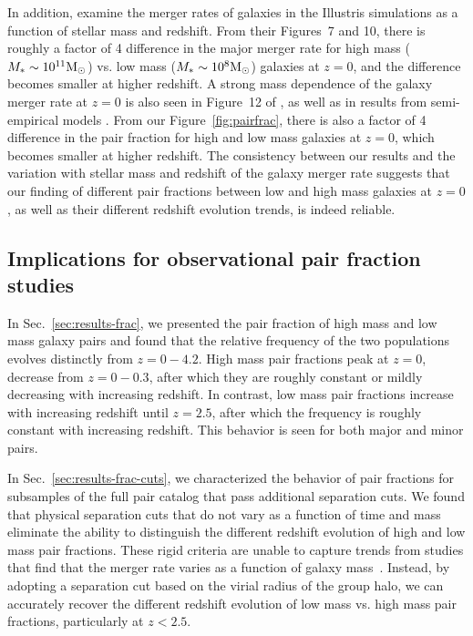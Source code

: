 \documentclass[twocolumn]{aastex631}
\begin{document}
        In addition, \cite{RG2015} examine the merger rates of galaxies in the Illustris simulations as a function of stellar mass and redshift.
        From their Figures~7 and 10, there is roughly a factor of 4 difference in the major merger rate for high mass ($M_* \sim 10^{11} \mathrm{M}_\odot$) vs. low mass ($M_* \sim 10^8 \mathrm{M}_\odot$) galaxies at $z=0$, and the difference becomes smaller at higher redshift. 
        A strong mass dependence of the galaxy merger rate at $z=0$ is also seen in Figure~12 of \cite{Guzman-Ortega2023}, as well as in results from semi-empirical models \citep{Stewart2009, Hopkins2010}.
        From our Figure~\ref{fig:pairfrac}, there is also a factor of 4 difference in the pair fraction for high and low mass galaxies at $z=0$, which becomes smaller at higher redshift.
        The consistency between our results and the variation with stellar mass and redshift of the galaxy merger rate suggests that our finding of different pair fractions between low and high mass galaxies at $z=0$, as well as their different redshift evolution trends, is indeed reliable.  

\subsection{Implications for observational pair fraction studies}\label{sec:disc-obs}

    In Sec.~\ref{sec:results-frac}, we presented the pair fraction of high mass and low mass galaxy pairs and found that the relative frequency of the two populations evolves distinctly from $z=0-4.2$. 
    High mass pair fractions peak at $z=0$, decrease from $z=0-0.3$, after which they are roughly constant or mildly decreasing with increasing redshift. 
    In contrast, low mass pair fractions increase with increasing redshift until $z=2.5$, after which the frequency is roughly constant with increasing redshift. 
    This behavior is seen for both major and minor pairs.  

    In Sec.~\ref{sec:results-frac-cuts}, we characterized the behavior of pair fractions for subsamples of the full pair catalog that pass additional separation cuts.
    We found that physical separation cuts that do not vary as a function of time and mass eliminate the ability to distinguish the different redshift evolution of high and low mass pair fractions. These rigid criteria are unable to capture trends from studies that find that the merger rate varies as a function of galaxy mass~\citep{Stewart2009, Hopkins2010}. 
    Instead, by adopting a separation cut based on the virial radius of the group halo, we can accurately recover the different redshift evolution of low mass vs. high mass pair fractions, particularly at $z<2.5$.
\end{document}
